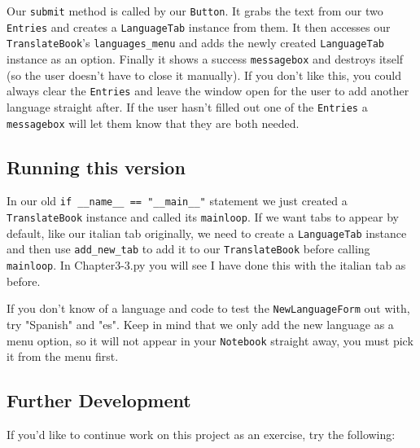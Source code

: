 \documentclass[a4paper,11pt,openany]{book}
\begin{document}
\vspace{5mm}

Our \lstinline[columns=fixed]{submit} method is called by our \lstinline[columns=fixed]{Button}. It grabs the text from our two \lstinline[columns=fixed]{Entries} and creates a \lstinline[columns=fixed]{LanguageTab} instance from them. It then accesses our \lstinline[columns=fixed]{TranslateBook}'s \lstinline[columns=fixed]{languages_menu} and adds the newly created \lstinline[columns=fixed]{LanguageTab} instance as an option. Finally it shows a success \lstinline[columns=fixed]{messagebox} and destroys itself (so the user doesn't have to close it manually). If you don't like this, you could always clear the \lstinline[columns=fixed]{Entries} and leave the window open for the user to add another language straight after. If the user hasn't filled out one of the \lstinline[columns=fixed]{Entries} a \lstinline[columns=fixed]{messagebox} will let them know that they are both needed. 

\subsection{Running this version}

In our old \lstinline[columns=fixed]{if __name__ == "__main__"} statement we just created a \lstinline[columns=fixed]{TranslateBook} instance and called its \lstinline[columns=fixed]{mainloop}. If we want tabs to appear by default, like our italian tab originally, we need to create a \lstinline[columns=fixed]{LanguageTab} instance and then use \lstinline[columns=fixed]{add_new_tab} to add it to our \lstinline[columns=fixed]{TranslateBook} before calling \lstinline[columns=fixed]{mainloop}. In Chapter3-3.py you will see I have done this with the italian tab as before. 

\vspace{5mm}

If you don't know of a language and code to test the \lstinline[columns=fixed]{NewLanguageForm} out with, try "Spanish" and "es". Keep in mind that we only add the new language as a menu option, so it will not appear in your \lstinline[columns=fixed]{Notebook} straight away, you must pick it from the menu first. 

\subsection{Further Development}

If you'd like to continue work on this project as an exercise, try the following:
\end{document}
